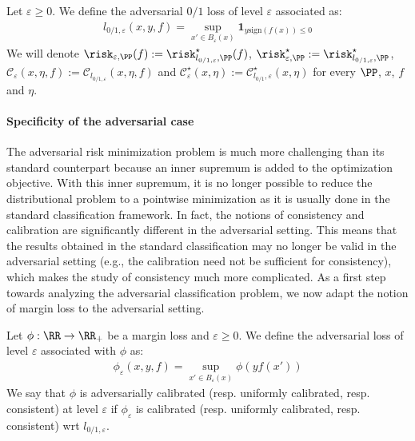 \begin{definition}
Let $\varepsilon\geq0$. We define the adversarial $0/1$ loss of level $\varepsilon$ associated as:
\begin{align*}
    l_{0/1,\varepsilon}(x,y,f) = \sup_{x'\in B_\varepsilon(x)} \mathbf{1}_{y\text{sign}(f(x))\leq 0}
\end{align*}
We will denote $\risk_{\varepsilon,\PP}(f) :=\risk_{l_{0/1,\varepsilon},\PP}^\star(f)$,  $\risk_{\varepsilon,\PP}^\star :=\risk_{l_{0/1,\varepsilon},\PP}^\star$, $\mathcal{C}_\varepsilon(x,\eta,f):= \mathcal{C}_{l_{0/1,\varepsilon}}(x,\eta,f)$ and $\mathcal{C}^\star_\varepsilon(x,\eta):= \mathcal{C}^\star_{l_{0/1},\varepsilon}(x,\eta)$ for every $\PP$, $x$, $f$ and $\eta$. 
\end{definition}




\paragraph{Specificity of the adversarial case}
The adversarial risk minimization problem is much more challenging than its standard counterpart because an inner supremum is added to the optimization objective. With this inner supremum, it is no longer possible to reduce the distributional problem to a pointwise minimization as it is usually done in the standard classification framework. In fact, the notions of consistency and calibration are significantly different in the adversarial setting. This means that the results obtained in the standard classification may no longer be valid in the adversarial setting (e.g., the calibration need not be sufficient for consistency), which makes the study of consistency much more complicated. As a first step towards analyzing the adversarial classification problem, we now adapt the notion of margin loss to the adversarial setting.

\begin{definition}
Let $\phi:\RR\to\RR_+$ be a margin loss and $\varepsilon\geq0$. We define the adversarial loss of level $\varepsilon$ associated with $\phi$ as:
\begin{align*}
    \phi_\varepsilon(x,y,f) = \sup_{x'\in B_\varepsilon(x)} \phi(yf(x'))
\end{align*}
We say that $\phi$ is adversarially calibrated (resp. uniformly calibrated, resp. consistent) at level $\varepsilon$ if $\phi_\varepsilon$ is calibrated (resp. uniformly calibrated, resp. consistent) wrt $l_{0/1,\varepsilon}$.
\end{definition}


